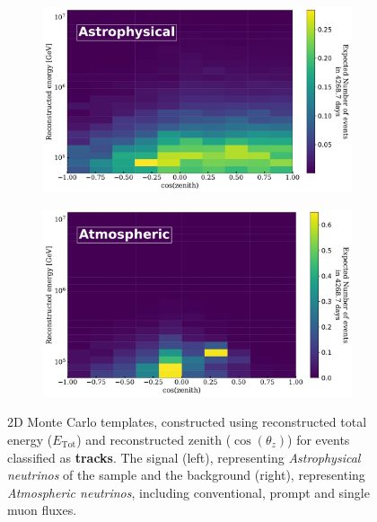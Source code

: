 \begin{figure}[h!]
    \begin{subfigure}[h]{0.72\textwidth}
        \includegraphics{./figures/Analysis/Tracks_Astrophysical.pdf}
    \end{subfigure}
    \hfill
    \begin{subfigure}[h]{0.72\textwidth}
        \includegraphics{./figures/Analysis/Tracks_Atmospheric.pdf}
       
    \end{subfigure}%
    \caption[2D Monte Carlo templates for tracks sample for astrophysical and atmopsheric fluxes]{2D Monte Carlo templates, constructed using reconstructed total energy ($E_{\text{Tot}}$) and reconstructed zenith ($\cos(\theta_z)$) for events classified as \textbf{tracks}. The signal (left), representing \emph{Astrophysical neutrinos} of the sample and the background (right), representing \emph{Atmospheric neutrinos}, including conventional, prompt and single muon fluxes.}
\end{figure}

